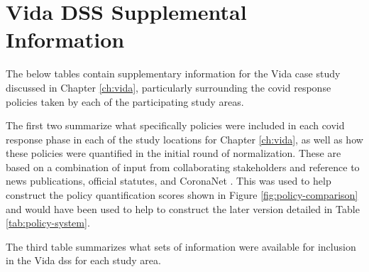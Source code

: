 \chapter{Vida DSS Supplemental Information} \label{app:policy-summary}

The below tables contain supplementary information for the Vida case study discussed in Chapter \ref{ch:vida}, particularly surrounding the \ac{covid} response policies taken by each of the participating study areas. 

The first two summarize what specifically policies were included in each \ac{covid} response phase in each of the study locations for Chapter \ref{ch:vida}, as well as how these policies were quantified in the initial round of normalization. These are based on a combination of input from collaborating stakeholders and reference to news publications, official statutes, and CoronaNet \cite{CoronaNetResearchProject}. This was used to help construct the policy quantification scores shown in Figure \ref{fig:policy-comparison} and would have been used to help to construct the later version detailed in Table \ref{tab:policy-system}.

The third table summarizes what sets of information were available for inclusion in the Vida \ac{dss} for each study area.

